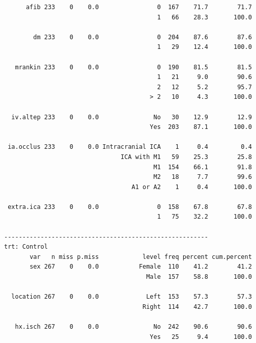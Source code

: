 \documentclass[]{book}
\theoremstyle{definition}
\theoremstyle{definition}
\theoremstyle{definition}
\theoremstyle{remark}
\begin{document}
\begin{verbatim}
      afib 233    0    0.0                0  167    71.7        71.7
                                          1   66    28.3       100.0
                                                                    
        dm 233    0    0.0                0  204    87.6        87.6
                                          1   29    12.4       100.0
                                                                    
   mrankin 233    0    0.0                0  190    81.5        81.5
                                          1   21     9.0        90.6
                                          2   12     5.2        95.7
                                        > 2   10     4.3       100.0
                                                                    
  iv.altep 233    0    0.0               No   30    12.9        12.9
                                        Yes  203    87.1       100.0
                                                                    
 ia.occlus 233    0    0.0 Intracranial ICA    1     0.4         0.4
                                ICA with M1   59    25.3        25.8
                                         M1  154    66.1        91.8
                                         M2   18     7.7        99.6
                                   A1 or A2    1     0.4       100.0
                                                                    
 extra.ica 233    0    0.0                0  158    67.8        67.8
                                          1   75    32.2       100.0
                                                                    
-------------------------------------------------------- 
trt: Control
       var   n miss p.miss            level freq percent cum.percent
       sex 267    0    0.0           Female  110    41.2        41.2
                                       Male  157    58.8       100.0
                                                                    
  location 267    0    0.0             Left  153    57.3        57.3
                                      Right  114    42.7       100.0
                                                                    
   hx.isch 267    0    0.0               No  242    90.6        90.6
                                        Yes   25     9.4       100.0
                                                                    

\end{verbatim}
\end{document}
